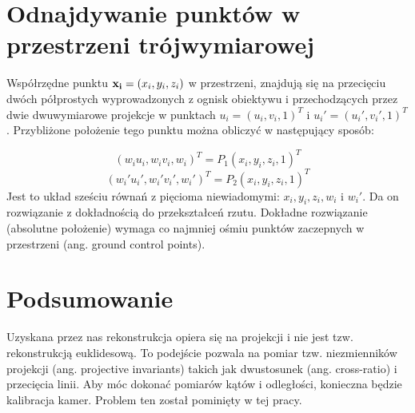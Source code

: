 \section{Odnajdywanie punktów w przestrzeni trójwymiarowej}

Współrzędne punktu ${\bf x_i} = (x_i, y_i, z_i) $ w przestrzeni, znajdują się
na przecięciu dwóch półprostych wyprowadzonych z ognisk obiektywu i
przechodzących przez dwie dwuwymiarowe projekcje w punktach $u_i = (u_i, v_i, 1)^T$ i
$u_i\prime = (u_i\prime, v_i\prime, 1)^T$. Przybliżone położenie tego punktu
można obliczyć w następujący sposób: 

\begin{equation} (w_i u_i, w_i v_i, w_i)^T = P_1(x_i, y_i, z_i, 1)^T
\end{equation} \begin{equation} (w_i\prime u_i\prime, w_i\prime v_i\prime,
  w_i\prime)^T = P_2(x_i, y_i, z_i, 1)^T \end{equation} Jest to układ sześciu
  równań z pięcioma niewiadomymi: $x_i, y_i, z_i, w_i$ i $w_i\prime$. Da on
  rozwiązanie z dokładnością do przekształceń rzutu.  Dokładne rozwiązanie
  (absolutne położenie) wymaga co najmniej ośmiu punktów zaczepnych w
  przestrzeni (ang. ground control points).

\section{Podsumowanie}

Uzyskana przez nas rekonstrukcja opiera się na projekcji i nie jest tzw.
rekonstrukcją euklidesową. To podejście pozwala na pomiar tzw. niezmienników
projekcji (ang. projective invariants) takich jak dwustosunek (ang.
cross-ratio) i przecięcia linii. Aby móc dokonać pomiarów kątów i odległości,
konieczna będzie kalibracja kamer. Problem ten został pominięty w tej pracy.
